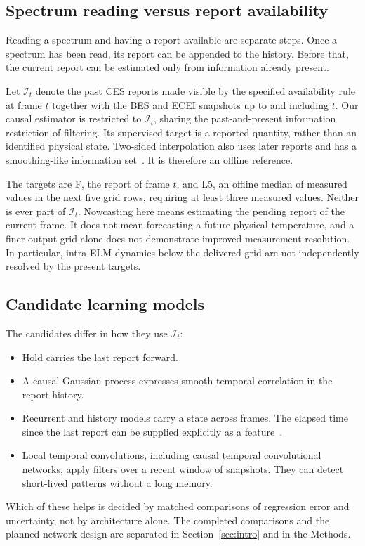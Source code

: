 \subsection{Spectrum reading versus report availability}
Reading a spectrum and having a report available are separate steps. Once a spectrum has been read, its report can be appended to the history. Before that, the current report can be estimated only from information already present.

Let $\mathcal{I}_t$ denote the past CES reports made visible by the specified availability rule at frame $t$ together with the BES and ECEI snapshots up to and including $t$. Our causal estimator is restricted to $\mathcal{I}_t$, sharing the past-and-present information restriction of filtering. Its supervised target is a reported quantity, rather than an identified physical state. Two-sided interpolation also uses later reports and has a smoothing-like information set~\citep{Shukla2020SurveyPrinciples,VanMulders2025ModelBased}. It is therefore an offline reference.

The targets are F, the report of frame $t$, and L5, an offline median of measured values in the next five grid rows, requiring at least three measured values. Neither is ever part of $\mathcal{I}_t$. Nowcasting here means estimating the pending report of the current frame. It does not mean forecasting a future physical temperature, and a finer output grid alone does not demonstrate improved measurement resolution. In particular, intra-ELM dynamics below the delivered grid are not independently resolved by the present targets.

\subsection{Candidate learning models}
The candidates differ in how they use $\mathcal{I}_t$:
\begin{itemize}\setlength{\itemsep}{1pt}
\item Hold carries the last report forward.
\item A causal Gaussian process expresses smooth temporal correlation in the report history.
\item Recurrent and history models carry a state across frames. The elapsed time since the last report can be supplied explicitly as a feature~\citep{Che2018RecurrentNeural}.
\item Local temporal convolutions, including causal temporal convolutional networks, apply filters over a recent window of snapshots. They can detect short-lived patterns without a long memory.
\end{itemize}
Which of these helps is decided by matched comparisons of regression error and uncertainty, not by architecture alone. The completed comparisons and the planned network design are separated in Section~\ref{sec:intro} and in the Methods.
